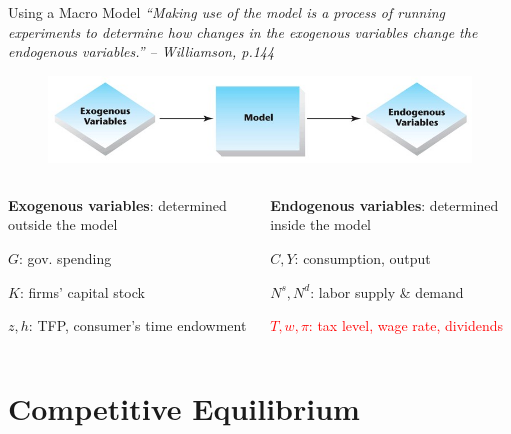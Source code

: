 \documentclass[11pt,aspectratio=169,usenames,dvipsnames]{beamer}
\newcommand{\red}[1]{\textcolor{red}{#1}}
\let\tempone\itemize
\let\temptwo\enditemize
\renewenvironment{itemize}{\tempone\addtolength{\itemsep}{\fill}}{\temptwo}
\let\tempa\enumerate
\let\tempb\endenumerate
\renewenvironment{enumerate}{\tempa\addtolength{\itemsep}{\fill}}{\tempb}
\begin{document}
\begin{frame}{Using a Macro Model}
\label{slide:Using_a_Macro_Model}
        \textit{\scriptsize ``Making use of the model is a process of running experiments to determine how changes in the exogenous variables change the endogenous variables.'' – Williamson, p.144}
    \begin{figure}
        \includegraphics[width=\textwidth]{./figures/MacroModelStructure.jpg}
    \end{figure}
    \begin{columns}
        \begin{column}{0.5\textwidth}
            \textbf{Exogenous variables}: determined \alert{outside} the model
            \begin{enumerate}
                \item $ G $: gov. spending
                \item $ K $: firms' capital stock
                \item $ z, h $: TFP, consumer's time endowment
            \end{enumerate}
        \end{column}
        \begin{column}{0.5\textwidth}
            \textbf{Endogenous variables}: determined \alert{inside} the model
            \begin{itemize}
                \item $ C, Y$: consumption, output
                \item $ N^{s}, N^{d} $: labor supply \& demand
                \item \red{$ T, w, \pi $: tax level, wage rate, dividends}
            \end{itemize}
        \end{column}
    \end{columns}
\end{frame}

\section{Competitive Equilibrium}
\label{sec:Competitive_Equilibrium}
\end{document}
